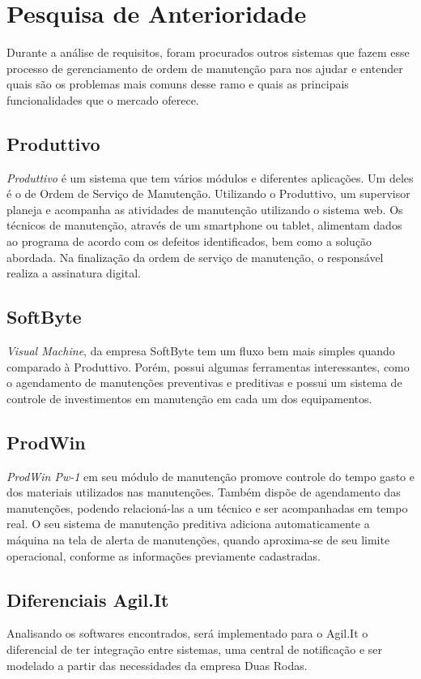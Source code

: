 \chapter{Pesquisa de Anterioridade}
Durante a análise de requisitos, foram procurados outros sistemas que fazem esse processo de gerenciamento de ordem de manutenção para nos ajudar e entender quais são os problemas mais comuns desse ramo e quais as principais funcionalidades que o mercado oferece.

\section{Produttivo}

\textit{Produttivo} é um sistema que tem vários módulos e diferentes aplicações. Um deles é o de Ordem de Serviço de Manutenção.
Utilizando o Produttivo, um supervisor planeja e acompanha as atividades de manutenção utilizando o sistema web. Os técnicos de manutenção, através de um smartphone ou tablet, alimentam dados ao programa de acordo com os defeitos identificados, bem como a solução abordada. Na finalização da ordem de serviço de manutenção, o responsável realiza a assinatura digital. \cite{produttivo}


\section{SoftByte}
\textit{Visual Machine}, da empresa SoftByte tem um fluxo bem mais simples quando comparado à Produttivo. Porém, possui algumas ferramentas interessantes, como o agendamento de manutenções preventivas e preditivas e possui um sistema de controle de investimentos em manutenção em cada um dos equipamentos. \cite{softbyte}


\section{ProdWin}
\textit{ProdWin Pw-1} em seu módulo de manutenção promove controle do tempo gasto e dos materiais utilizados nas manutenções. Também dispõe de agendamento das manutenções, podendo relacioná-las a um técnico e ser acompanhadas em tempo real. O seu sistema de manutenção preditiva adiciona automaticamente a máquina na tela de alerta de manutenções, quando aproxima-se de seu limite operacional, conforme as informações previamente cadastradas. \cite{prodwin}

\section{Diferenciais Agil.It}
Analisando os softwares encontrados, será implementado para o Agil.It o diferencial de ter integração entre sistemas, uma central de notificação e ser modelado a partir das necessidades da empresa Duas Rodas.